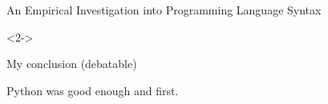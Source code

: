 \documentclass[aspectratio=169]{beamer}
\begin{document}
\begin{frame}{An Empirical Investigation into Programming Language Syntax}
\vspace{-7.6 cm}
\begin{uncoverenv}<2->
\begin{center}
\end{center}
\end{uncoverenv}
\end{frame}

\begin{frame}{My conclusion (debatable)}
\huge
\vspace{1 cm}
\begin{center}
Python was good enough and first.
\end{center}
\end{frame}
\end{document}
